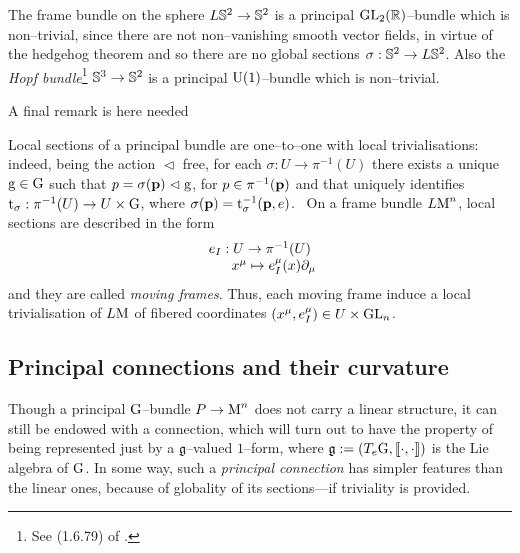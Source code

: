 \begin{example}
    The frame bundle on the sphere $L\S^2\to\S^2$ is a principal $\GL_2(\R)$--bundle which is non--trivial, since there are not non--vanishing smooth vector fields, in virtue of the hedgehog theorem and so there are no global sections $\sigma:\S^2\to L\S^2$. \quad Also the \emph{Hopf bundle}\footnote{See (1.6.79) of \cite{fatib}.}  $\S^3\to\S^2$ is a principal $\U(1)$--bundle which is non--trivial.
\end{example}
 A final remark is here needed
\begin{remark}\label{moving_frames}
    Local sections of a principal bundle are one--to--one with local trivialisations: indeed, being the action $\vartriangleleft$ free, for each $\sigma:U\to\pi^{-1}(U)$ there exists a unique $\g\in\G$ such that $p=\sigma(\p)\vartriangleleft\g$, for $p\in\pi^{-1}(\p)$ and that uniquely identifies $\t_\sigma:\pi^{-1}(U)\to U\times\G$, where $\sigma(\p)=\t_\sigma^{-1}(\p,e)$. \, On a frame bundle $L\M^n$, local sections are described in the form
    $$\begin{matrix}
        e_I:U\to\pi^{-1}(U)\\
        \qquad x^\mu\mapsto e^\mu_I(x)\der_\mu
    \end{matrix}$$
    and they are called \emph{moving frames}. Thus, each moving frame induce a local trivialisation of $L\M$ of fibered coordinates $(x^\mu,e^\mu_I)\in U\times\GL_n$.
\end{remark}

\subsection{Principal connections and their curvature}\label{section_princ_conn}

Though a principal $\G$--bundle $P\to\M^n$ does not carry a linear structure, it can still be endowed with a connection, which will turn out to have the property of being represented just by a $\mathfrak{g}$--valued $1$--form, where $\mathfrak{g}:=(T_e\G,\llbracket\cdot,\cdot\rrbracket)$ is the Lie algebra of $\G$. In some way, such a \emph{principal connection} has simpler features than the linear ones, because of globality of its sections---if triviality is provided.

